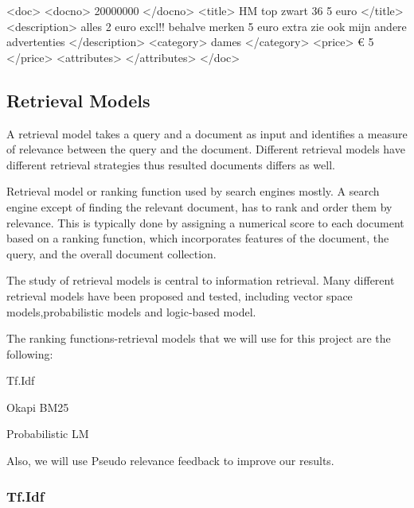 \documentclass{article}
\begin{document}
\begin{code}[caption={TREC formated classified}]
<doc>
	<docno> 20000000 </docno>
	<title> HM top zwart 36 5 euro </title>
	<description>
		alles 2 euro excl!!
		behalve merken 5 euro extra
		zie ook mijn andere advertenties
	</description>
	<category> dames </category>
	<price>	€ 5 </price>
	<attributes>	</attributes>
</doc>
\end{code}



\begin{code}[caption={To do}]

\end{code}



\subsection{Retrieval Models}

A retrieval model takes a query and a document as input and identifies a measure of relevance between the query and the document. Different retrieval models have different retrieval strategies thus resulted documents differs as well.

Retrieval model or ranking function used by search engines mostly. A search engine except of finding the relevant document, has to rank and order them by relevance. This is typically done by assigning a numerical score to each document based on a ranking function, which incorporates features of the document, the query, and the overall document collection.

The study of retrieval models is central to information retrieval. Many different retrieval models have been proposed and tested, including vector space models,probabilistic models and logic-based model.

The ranking functions-retrieval models that we will use for this project are the following:
\begin{list}{.}{}
\item Tf.Idf
\item Okapi BM25
\item Probabilistic LM
\end{list}

Also, we will use Pseudo relevance feedback to improve our results.

\subsubsection{Tf.Idf}
\end{document}
